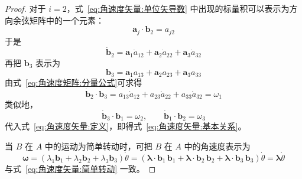\begin{proof}
    对于 $i=2$，式~\eqref{eq:角速度矢量:单位矢导数} 中出现的标量积可以表示为方向余弦矩阵中的一个元素：
\begin{equation}
    \mathbf{a}_j\cdot\mathbf{b}_2 = a_{j2}
\end{equation}
于是
\begin{equation}
    \dot{\mathbf{b}}_2 = \mathbf{a}_1\dot{a}_{12} + \mathbf{a}_2\dot{a}_{22} + \mathbf{a}_3\dot{a}_{32}
\end{equation}
再把 $\mathbf{b}_3$ 表示为
\begin{equation}
    \mathbf{b}_3 = \mathbf{a}_1a_{13} + \mathbf{a}_2a_{23} + \mathbf{a}_3a_{33}
\end{equation}
由式~\eqref{eq:角速度矩阵:分量公式}可求得
\begin{equation}
    \dot{\mathbf{b}}_2\cdot\mathbf{b}_3 = a_{13}\dot{a}_{12} + a_{23}\dot{a}_{22} + a_{33}\dot{a}_{32} = \omega_1
\end{equation}
类似地，
\begin{equation}
    \dot{\mathbf{b}}_3\cdot\mathbf{b}_1 = \omega_2,\qquad
    \dot{\mathbf{b}}_1\cdot\mathbf{b}_2 = \omega_3
\end{equation}
代入式~\eqref{eq:角速度矢量:定义}，即得式~\eqref{eq:角速度矢量:基本关系}。

当 $B$ 在 $A$ 中的运动为简单转动时，可把 $B$ 在 $A$ 中的角速度表示为
\begin{equation}
    \bm{\omega} = (\lambda_1\mathbf{b}_1 + \lambda_2\mathbf{b}_2 + \lambda_3\mathbf{b}_3)\dot{\theta}
    = (\bm{\lambda}\cdot\mathbf{b}_1\,\mathbf{b}_1 + \bm{\lambda}\cdot\mathbf{b}_2\,\mathbf{b}_2 + \bm{\lambda}\cdot\mathbf{b}_3\,\mathbf{b}_3)\dot{\theta}
    = \bm{\lambda}\dot{\theta}
\end{equation}
与式~\eqref{eq:角速度矢量:简单转动} 一致。


\end{proof}
